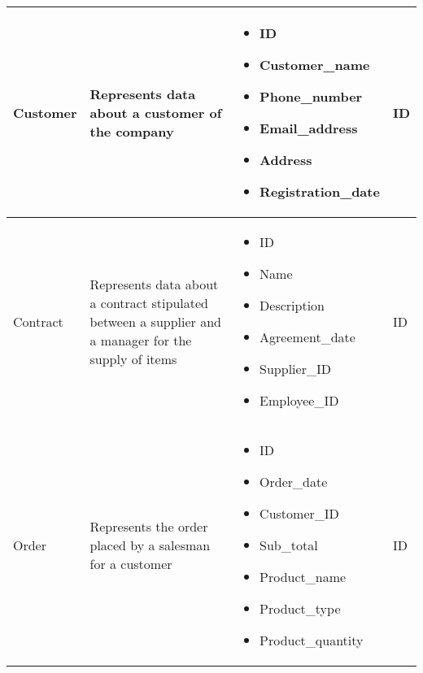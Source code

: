 \begin{longtable}{|p{}|p{} |p{}|p{} |}
    Customer & Represents data about a customer of the company &
    \begin{itemize}
        \vspace{-1em}
        \item ID
        \item Customer\_name
        \item Phone\_number
        \item Email\_address        %
        \item Address
        \item Registration\_date    %
    \end{itemize}
    &  ID \\\hline

    Contract & Represents data about a contract stipulated between a supplier and a manager for the supply of items &
    \begin{itemize}
        \vspace{-1em}
        \item ID
        \item Name
        \item Description
        \item Agreement\_date       %
        \item Supplier\_ID
        \item Employee\_ID          %
    \end{itemize}
    &  ID \\\hline

    Order & Represents the order placed by a salesman for a customer &
    \begin{itemize}
        \vspace{-1em}
        \item ID
        \item Order\_date
        \item Customer\_ID
        \item Sub\_total            %
        \item Product\_name         %
        \item Product\_type
        \item Product\_quantity
    \end{itemize}
    &  ID \\\hline


\end{longtable}
